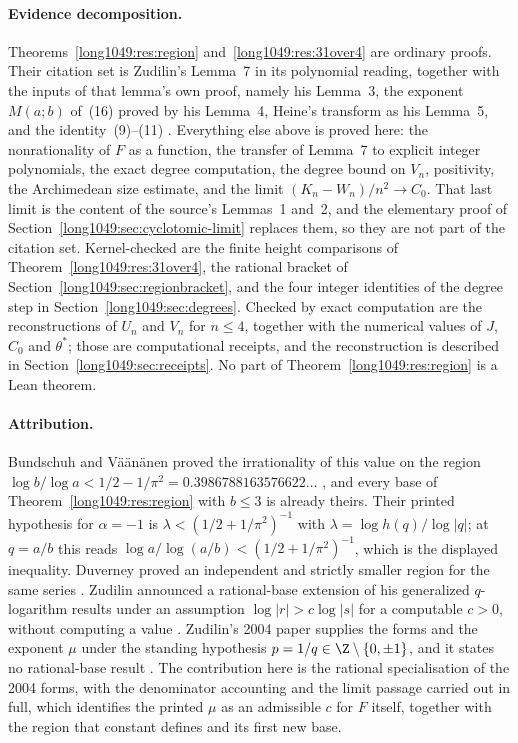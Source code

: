 \documentclass[11pt]{article}
\begin{document}
\paragraph{Evidence decomposition.}
Theorems~\ref{long1049:res:region} and~\ref{long1049:res:31over4} are ordinary proofs.  Their
citation set is Zudilin's Lemma~7 in its polynomial reading, together with the
inputs of that lemma's own proof, namely his Lemma~3, the exponent $M(a;b)$
of~(16) proved by his Lemma~4, Heine's transform as his Lemma~5, and the
identity~(9)--(11) \cite{zudilin2004}.  Everything else above is proved here:
the nonrationality of $F$ as a function, the transfer of Lemma~7 to explicit
integer polynomials, the exact degree computation, the degree bound on $V_n$,
positivity, the Archimedean size estimate, and the limit
$(K_n-W_n)/n^{2}\to C_0$.  That last limit is the content of the source's
Lemmas~1 and~2, and the elementary proof of
Section~\ref{long1049:sec:cyclotomic-limit} replaces them, so they are not part of the
citation set.  Kernel-checked are the finite height comparisons of
Theorem~\ref{long1049:res:31over4}, the rational bracket of
Section~\ref{long1049:sec:regionbracket}, and the four integer identities of the degree
step in Section~\ref{long1049:sec:degrees}.  Checked by exact computation are the
reconstructions of $U_n$ and $V_n$ for $n\le4$, together with the numerical
values of $J$, $C_0$ and $\theta^{*}$; those are computational receipts, and
the reconstruction is described in Section~\ref{long1049:sec:receipts}.  No part of
Theorem~\ref{long1049:res:region} is a Lean theorem.

\paragraph{Attribution.}
Bundschuh and V\"a\"an\"anen proved the irrationality of this value on the
region $\log b/\log a<1/2-1/\pi^{2}=0.3986788163576622\ldots$
\cite[Thm.~2, p.~177; hypotheses pp.~175--176]{bv1994}, and every base of
Theorem~\ref{long1049:res:region} with $b\le3$ is already theirs.  Their printed
hypothesis for $\alpha=-1$ is $\lambda<(1/2+1/\pi^{2})^{-1}$ with
$\lambda=\log h(q)/\log|q|$; at $q=a/b$ this reads
$\log a/\log(a/b)<(1/2+1/\pi^{2})^{-1}$, which is the displayed inequality.  Duverney proved an
independent and strictly smaller region for the same series
\cite[Th\'eor\`eme~2, p.~174]{duverney1996}.  Zudilin announced a rational-base
extension of his generalized $q$-logarithm results under an assumption
$\log|r|>c\log|s|$ for a computable $c>0$, without computing a value
\cite{zudilin2016}.  Zudilin's 2004 paper supplies the forms and the exponent
$\mu$ under the standing hypothesis $p=1/q\in\Z\mathbin{\backslash}\{0,\pm1\}$, and it
states no rational-base result \cite[Sec.~2, p.~154; Thm.~1]{zudilin2004}.  The
contribution here is the rational specialisation of the 2004 forms, with the
denominator accounting and the limit passage carried out in full, which
identifies the printed $\mu$ as an admissible $c$ for $F$ itself, together with
the region that constant defines and its first new base.
\end{document}
